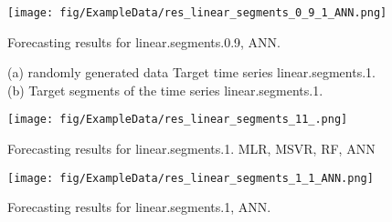 \documentclass[12pt]{article}
\begin{document}
\begin{figure}
\centering
\texttt{[image: fig/ExampleData/res\_linear\_segments\_0\_9\_1\_ANN.png]}
\caption{Forecasting results for	linear.segments.0.9,	ANN.	}
\end{figure}


\begin{figure}
\centering
{}
\caption{(a)	randomly generated data	Target time series	linear.segments.1.		(b)		Target segments of the time series	linear.segments.1.		}
\end{figure}



\begin{figure}
\centering
\texttt{[image: fig/ExampleData/res\_linear\_segments\_11\_.png]}
\caption{Forecasting results for	linear.segments.1.	MLR, MSVR, RF, ANN}
\end{figure}


\begin{figure}
\centering
\texttt{[image: fig/ExampleData/res\_linear\_segments\_1\_1\_ANN.png]}
\caption{Forecasting results for	linear.segments.1,	ANN.	}
\end{figure}
\end{document}
